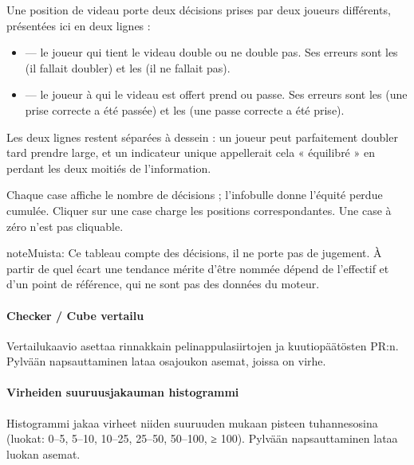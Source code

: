 \documentclass[letterpaper,10pt,finnish]{sphinxmanual}
\begin{document}
\sphinxAtStartPar
Une position de videau porte deux décisions prises par deux joueurs
différents, présentées ici en deux lignes :
\begin{itemize}
\item {} 
\sphinxAtStartPar
{} — le joueur qui tient le videau double ou ne double pas. Ses
erreurs sont les  (il fallait doubler) et les  (il ne fallait pas).

\item {} 
\sphinxAtStartPar
{} — le joueur à qui le videau est offert prend ou passe. Ses
erreurs sont les  (une prise correcte a été passée) et les
 (une passe correcte a été prise).

\end{itemize}

\sphinxAtStartPar
Les deux lignes restent séparées à dessein : un joueur peut parfaitement
doubler tard  prendre large, et un indicateur unique appellerait cela
« équilibré » en perdant les deux moitiés de l’information.

\sphinxAtStartPar
Chaque case affiche le nombre de décisions ; l’infobulle donne l’équité perdue
cumulée. Cliquer sur une case charge les positions correspondantes. Une case à
zéro n’est pas cliquable.

\begin{sphinxadmonition}{note}{Muista:}
\sphinxAtStartPar
Ce tableau compte des décisions, il ne porte pas de jugement. À partir de
quel écart une tendance mérite d’être nommée dépend de l’effectif et d’un
point de référence, qui ne sont pas des données du moteur.
\end{sphinxadmonition}


\paragraph{Checker / Cube \sphinxhyphen{}vertailu}
\label{\detokenize{manuel:repartition-checker-cube}}
\sphinxAtStartPar
Vertailukaavio asettaa rinnakkain pelinappulasiirtojen ja kuutiopäätösten PR:n. Pylvään napsauttaminen lataa osajoukon asemat, joissa on virhe.


\paragraph{Virheiden suuruusjakauman histogrammi}
\label{\detokenize{manuel:histogramme-des-magnitudes-d-erreur}}
\sphinxAtStartPar
Histogrammi jakaa virheet niiden suuruuden mukaan pisteen tuhannesosina (luokat: 0–5, 5–10, 10–25, 25–50, 50–100, ≥ 100). Pylvään napsauttaminen lataa luokan asemat.
\end{document}
